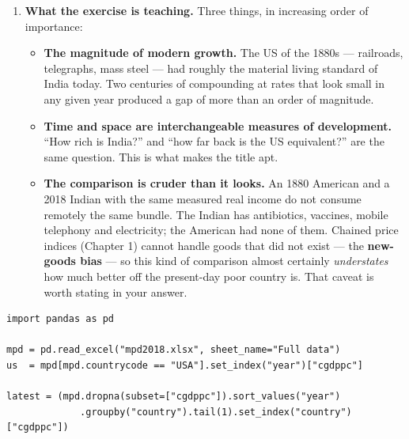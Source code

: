 \documentclass[12pt, letterpaper]{article}
\begin{document}
\begin{tcolorbox}[oddbox,title={Problem 3.1 \quad The Past is a Foreign Country}]
\begin{enumerate}
\begin{tcolorbox}[databox,title={Treat these as orders of magnitude, not answers}]
China's level in particular moves fast --- its GDP per capita roughly doubled in the decade
before the 2018 release --- so the crossing year is sensitive to the vintage. Report the year
\emph{and} the release you used.
\end{tcolorbox}

\item \textbf{What the exercise is teaching.} Three things, in increasing order of
importance:

\begin{itemize}[leftmargin=1.3em,itemsep=3pt,topsep=2pt]
\item \textbf{The magnitude of modern growth.} The US of the 1880s --- railroads,
      telegraphs, mass steel --- had roughly the material living standard of India today.
      Two centuries of compounding at rates that look small in any given year produced a
      gap of more than an order of magnitude.
\item \textbf{Time and space are interchangeable measures of development.} ``How rich is
      India?'' and ``how far back is the US equivalent?'' are the same question. This is
      what makes the title apt.
\item \textbf{The comparison is cruder than it looks.} An 1880 American and a 2018 Indian
      with the same measured real income do not consume remotely the same bundle. The Indian
      has antibiotics, vaccines, mobile telephony and electricity; the American had none of
      them. Chained price indices (Chapter 1) cannot handle goods that did not exist ---
      the \textbf{new-goods bias} --- so this kind of comparison almost certainly
      \emph{understates} how much better off the present-day poor country is. That caveat is
      worth stating in your answer.
\end{itemize}

\end{enumerate}

\begin{tcolorbox}[theorybox,title={Code}]
\footnotesize
\begin{verbatim}
import pandas as pd

mpd = pd.read_excel("mpd2018.xlsx", sheet_name="Full data")
us  = mpd[mpd.countrycode == "USA"].set_index("year")["cgdppc"]

latest = (mpd.dropna(subset=["cgdppc"]).sort_values("year")
             .groupby("country").tail(1).set_index("country")["cgdppc"])


\end{verbatim}
\end{tcolorbox}
\end{tcolorbox}
\end{document}
